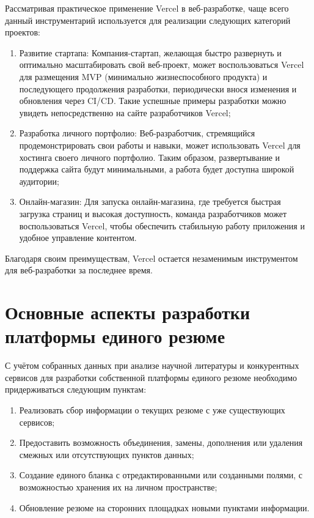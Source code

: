 \documentclass[master, och, diploma]{SCWorks}
\begin{document}
Рассматривая практическое применение Vercel в веб-разработке, чаще всего данный инструментарий используется для реализации следующих категорий проектов:
\begin{enumerate}
    \item Развитие стартапа: Компания-стартап, желающая быстро развернуть и оптимально масштабировать свой веб-проект, может воспользоваться Vercel для размещения MVP (минимально жизнеспособного продукта) и последующего продолжения разработки, периодически внося изменения и обновления через CI/CD. Такие успешные примеры разработки можно увидеть непосредственно на сайте разработчиков Vercel\cite{vercel_mural};
    \item Разработка личного портфолио: Веб-разработчик, стремящийся продемонстрировать свои работы и навыки, может использовать Vercel для хостинга своего личного портфолио. Таким образом, развертывание и поддержка сайта будут минимальными, а работа будет доступна широкой аудитории;
    \item Онлайн-магазин: Для запуска онлайн-магазина, где требуется быстрая загрузка страниц и высокая доступность, команда разработчиков может воспользоваться Vercel, чтобы обеспечить стабильную работу приложения и удобное управление контентом.
\end{enumerate}

Благодаря своим преимуществам, Vercel остается незаменимым инструментом для веб-разработки за последнее время.






\section{Основные аспекты разработки платформы единого резюме}
С учётом собранных данных при анализе научной литературы и конкурентных сервисов для разработки собственной платформы единого резюме необходимо придерживаться следующим пунктам:
\begin{enumerate}
    \item Реализовать сбор информации о текущих резюме с уже существующих сервисов;
    \item Предоставить возможность объединения, замены, дополнения или удаления 
    смежных или отсутствующих пунктов данных;
    \item Создание единого бланка с отредактированными или созданными полями, 
    с возможностью хранения их на личном пространстве;
    \item Обновление резюме на сторонних площадках новыми пунктами информации.
\end{enumerate}
\end{document}
